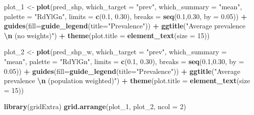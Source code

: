 \documentclass[
  letterpaper,
]{krantz}
\newenvironment{Shaded}{\begin{snugshade}}{\end{snugshade}}
\newcommand{\AttributeTok}[1]{\textcolor[rgb]{0.13,0.29,0.53}{#1}}
\newcommand{\DecValTok}[1]{\textcolor[rgb]{0.00,0.00,0.81}{#1}}
\newcommand{\FloatTok}[1]{\textcolor[rgb]{0.00,0.00,0.81}{#1}}
\newcommand{\FunctionTok}[1]{\textcolor[rgb]{0.13,0.29,0.53}{\textbf{#1}}}
\newcommand{\NormalTok}[1]{#1}
\newcommand{\OtherTok}[1]{\textcolor[rgb]{0.56,0.35,0.01}{#1}}
\newcommand{\SpecialCharTok}[1]{\textcolor[rgb]{0.81,0.36,0.00}{\textbf{#1}}}
\newcommand{\StringTok}[1]{\textcolor[rgb]{0.31,0.60,0.02}{#1}}
\begin{document}
\begin{Shaded}
\begin{Highlighting}[]
\NormalTok{plot\_1 }\OtherTok{\textless{}{-}} 
\FunctionTok{plot}\NormalTok{(pred\_shp, }\AttributeTok{which\_target =} \StringTok{"prev"}\NormalTok{, }\AttributeTok{which\_summary =} \StringTok{"mean"}\NormalTok{,}
     \AttributeTok{palette =} \StringTok{"RdYlGn"}\NormalTok{,}
    \AttributeTok{limits =} \FunctionTok{c}\NormalTok{(}\FloatTok{0.1}\NormalTok{, }\FloatTok{0.30}\NormalTok{),}
    \AttributeTok{breaks =} \FunctionTok{seq}\NormalTok{(}\FloatTok{0.1}\NormalTok{,}\FloatTok{0.30}\NormalTok{, }\AttributeTok{by =} \FloatTok{0.05}\NormalTok{)) }\SpecialCharTok{+} 
  \FunctionTok{guides}\NormalTok{(}\AttributeTok{fill=}\FunctionTok{guide\_legend}\NormalTok{(}\AttributeTok{title=}\StringTok{"Prevalence"}\NormalTok{)) }\SpecialCharTok{+}
  \FunctionTok{ggtitle}\NormalTok{(}\StringTok{"Average prevalence }\SpecialCharTok{\textbackslash{}n}\StringTok{ (no weights)"}\NormalTok{) }\SpecialCharTok{+} 
   \FunctionTok{theme}\NormalTok{(}\AttributeTok{plot.title =} \FunctionTok{element\_text}\NormalTok{(}\AttributeTok{size =} \DecValTok{15}\NormalTok{))}

\NormalTok{plot\_2  }\OtherTok{\textless{}{-}} 
  \FunctionTok{plot}\NormalTok{(pred\_shp\_w, }\AttributeTok{which\_target =} \StringTok{"prev"}\NormalTok{, }\AttributeTok{which\_summary =} \StringTok{"mean"}\NormalTok{,}
     \AttributeTok{palette =} \StringTok{"RdYlGn"}\NormalTok{,}
    \AttributeTok{limits =} \FunctionTok{c}\NormalTok{(}\FloatTok{0.1}\NormalTok{, }\FloatTok{0.30}\NormalTok{),}
    \AttributeTok{breaks =} \FunctionTok{seq}\NormalTok{(}\FloatTok{0.1}\NormalTok{,}\FloatTok{0.30}\NormalTok{, }\AttributeTok{by =} \FloatTok{0.05}\NormalTok{)) }\SpecialCharTok{+} 
  \FunctionTok{guides}\NormalTok{(}\AttributeTok{fill=}\FunctionTok{guide\_legend}\NormalTok{(}\AttributeTok{title=}\StringTok{"Prevalence"}\NormalTok{)) }\SpecialCharTok{+}
  \FunctionTok{ggtitle}\NormalTok{(}\StringTok{"Average prevalence }\SpecialCharTok{\textbackslash{}n}\StringTok{ (population weighted)"}\NormalTok{) }\SpecialCharTok{+} 
  \FunctionTok{theme}\NormalTok{(}\AttributeTok{plot.title =} \FunctionTok{element\_text}\NormalTok{(}\AttributeTok{size =} \DecValTok{15}\NormalTok{))}

\FunctionTok{library}\NormalTok{(gridExtra)}
\FunctionTok{grid.arrange}\NormalTok{(plot\_1, plot\_2, }\AttributeTok{ncol =} \DecValTok{2}\NormalTok{)}
\end{Highlighting}
\end{Shaded}
\end{document}
